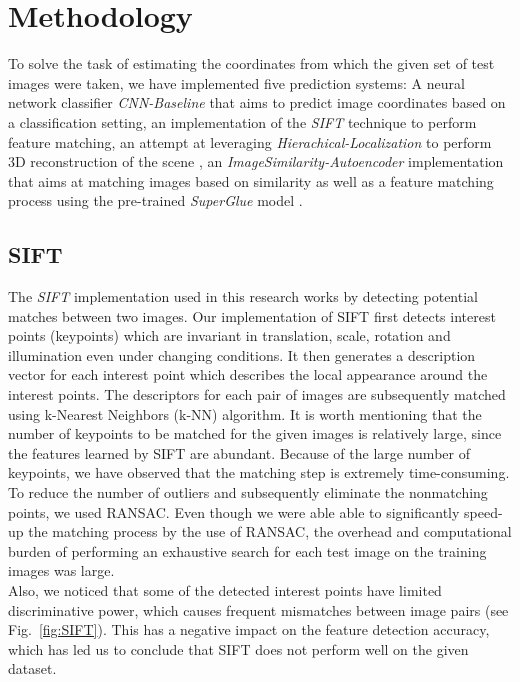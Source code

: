 \documentclass[conference]{IEEEtran}
\begin{document}
\section{Methodology}

To solve the task of estimating the coordinates from which the given set of test images were taken, we have implemented five prediction systems: A neural network classifier \textit{CNN-Baseline} that aims to predict image coordinates based on a classification setting, an implementation of the \textit{SIFT} technique to perform feature matching, an attempt at leveraging \textit{Hierachical-Localization} to perform 3D reconstruction of the scene \cite{b9}, an \textit{ImageSimilarity-Autoencoder} implementation that aims at matching images based on similarity as well as a feature matching process using the pre-trained \textit{SuperGlue} model \cite{b12}.


\subsection{SIFT}

The \textit{SIFT} implementation used in this research works by detecting potential matches between two images. Our implementation of SIFT first detects interest points (keypoints) which are invariant in translation, scale, rotation and illumination even under changing conditions. It then generates a description vector for each interest point which describes the local appearance around the interest points. The descriptors for each pair of images are subsequently matched using k-Nearest Neighbors (k-NN) algorithm. 
It is worth mentioning that the number of keypoints to be matched for the given images is relatively large, since the features learned by SIFT are abundant. Because of the large number of keypoints, we have observed that the matching step is extremely time-consuming. 
To reduce the number of outliers and subsequently eliminate the nonmatching points, we used RANSAC. Even though we were able able to significantly speed-up the matching process by the use of RANSAC, the overhead and computational burden of performing an exhaustive search for each test image on the training images was large. \\
Also, we noticed that some of the detected interest points have limited discriminative power, which causes frequent mismatches between image pairs (see Fig.~\ref{fig:SIFT}). This has a negative impact on the feature detection accuracy, which has led us to conclude that SIFT does not perform well on the given dataset.
\end{document}
